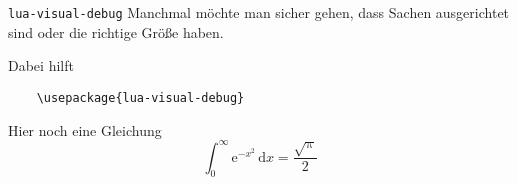 \begin{frame}[fragile]{\texttt{lua-visual-debug}}
  Manchmal möchte man sicher gehen, dass Sachen ausgerichtet sind oder die richtige Größe haben.
  
  Dabei hilft
  \begin{verbatim}
    \usepackage{lua-visual-debug}
  \end{verbatim}

  \vspace{2\baselineskip}
  Hier noch eine Gleichung
  \begin{equation}
    \int_0^\infty \mathup{e}^{-x^2} \, \mathup{d}x = \frac{\sqrt{\mathup{\pi}}}{2}
  \end{equation}
\end{frame}
